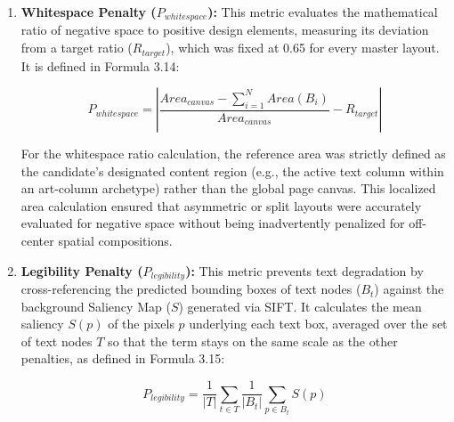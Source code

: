 \begin{refsection}
\begin{enumerate}
    The structural grid $G$ was dynamically constructed from the layout candidate's specific content area—spanning its margins, quarters, and center—and an element was evaluated as aligned when its left edge, center, or right edge lay on a gridline. 

	\item \textbf{Whitespace Penalty ($P_{whitespace}$):} This metric evaluates the mathematical ratio of negative space to positive design elements, measuring its deviation from a target ratio ($R_{target}$), which was fixed at 0.65 for every master layout. It is defined in Formula 3.14:
    
    \begin{center}
    \begin{minipage}{0.8\textwidth}
    \begin{equation}
    P_{whitespace} = \left| \frac{Area_{canvas} - \sum_{i=1}^{N} Area(B_i)}{Area_{canvas}} - R_{target} \right|
    \end{equation}
    \centering
    \end{minipage}
    \end{center}

    For the whitespace ratio calculation, the reference area was strictly defined as the candidate's designated content region (e.g., the active text column within an art-column archetype) rather than the global page canvas. This localized area calculation ensured that asymmetric or split layouts were accurately evaluated for negative space without being inadvertently penalized for off-center spatial compositions.
	
	\item \textbf{Legibility Penalty ($P_{legibility}$):} This metric prevents text degradation by cross-referencing the predicted bounding boxes of text nodes ($B_t$) against the background Saliency Map ($S$) generated via SIFT. It calculates the mean saliency $S(p)$ of the pixels $p$ underlying each text box, averaged over the set of text nodes $T$ so that the term stays on the same scale as the other penalties, as defined in Formula 3.15:
    
    \begin{center}
    \begin{minipage}{0.8\textwidth}
    \begin{equation}
    P_{legibility} = \frac{1}{|T|} \sum_{t \in T} \frac{1}{|B_t|} \sum_{p \in B_t} S(p)
    \end{equation}
    \centering
    \end{minipage}
    \end{center}


\end{enumerate}
\end{refsection}
